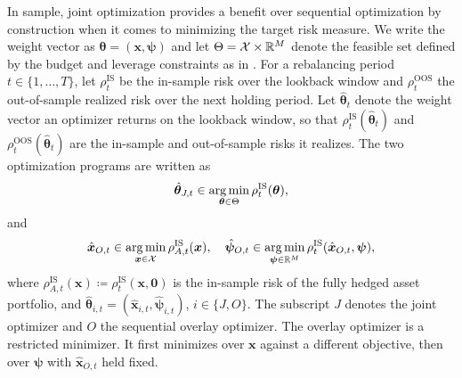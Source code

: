 In sample, joint optimization provides a benefit over sequential optimization by construction when it comes to minimizing 
the target risk measure. We write 
the weight vector as $\bm{\theta} = (\bm{x}, \bm{\psi})$ and let $\Theta = \mathcal{X} \times \mathbb{R}^M$ denote the 
feasible set defined by the budget and leverage constraints as in .
For a rebalancing period $t \in \{1, \dots, T\}$, let $\rho_t^{\text{IS}}$ be the in-sample risk over the 
lookback window and $\rho_t^{\text{OOS}}$ the out-of-sample realized risk over the next holding period. Let $\hat{\bm{\theta}}_t$ denote
the weight vector an 
optimizer returns on the lookback window, so that $\rho_t^{\text{IS}}(\hat{\bm{\theta}}_t)$ and $\rho_t^{\text{OOS}}(\hat{\bm{\theta}}_t)$ are the in-sample and out-of-sample risks it realizes. The two optimization programs are written as
\begin{equation*}
\hat{\bm{\theta}}_{J,t} \in \operatorname*{arg\,min}_{\bm{\theta} \in \Theta} \rho_t^{\text{IS}}(\bm{\theta}),
\end{equation*}
and
\begin{equation*}
\hat{\bm{x}}_{O,t} \in \operatorname*{arg\,min}_{\bm{x} \in \mathcal{X}} \rho_{A,t}^{\text{IS}}(\bm{x}),
\quad
\hat{\bm{\psi}}_{O,t} \in \operatorname*{arg\,min}_{\bm{\psi} \in \mathbb{R}^M} \rho_t^{\text{IS}}(\hat{\bm{x}}_{O,t}, \bm{\psi}),
\end{equation*}
where $\rho_{A,t}^{\text{IS}}(\bm{x}) \coloneqq \rho_t^{\text{IS}}(\bm{x}, \bm{0})$ is the in-sample risk of the fully hedged asset portfolio, and $\hat{\bm{\theta}}_{i,t} = (\hat{\bm{x}}_{i,t}, \hat{\bm{\psi}}_{i,t})$, $i\in\{J, O\}$. 
The subscript $J$ denotes the joint optimizer and $O$ the sequential overlay optimizer.
The overlay optimizer is a restricted minimizer. It first minimizes over $\bm{x}$ against a different objective, 
then over $\bm{\psi}$ with $\hat{\bm{x}}_{O,t}$ held fixed. 

